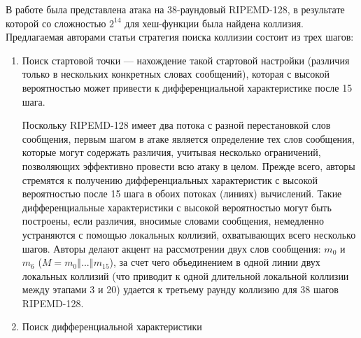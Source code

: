 \documentclass{./civarticle}
\begin{document}
В работе \cite{ripemdat1} была представлена атака на 38-раундовый RIPEMD-128, в результате которой со сложностью $2^{14}$ для хеш-функции была найдена коллизия. Предлагаемая авторами статьи стратегия поиска коллизии состоит из трех шагов:

\begin{enumerate}
    \item Поиск стартовой точки --- нахождение такой стартовой настройки
    (различия только в нескольких конкретных словах сообщений), которая с высокой вероятностью может привести к дифференциальной характеристике после 15 шага.

    Поскольку RIPEMD-128 имеет два потока с разной перестановкой слов сообщения, первым шагом в атаке является определение тех слов сообщения, которые могут содержать различия, учитывая несколько ограничений, позволяющих эффективно провести всю атаку в целом. 
    Прежде всего, авторы стремятся к получению дифференциальных характеристик с высокой вероятностью после 15 шага в обоих потоках (линиях) вычислений. Такие дифференциальные характеристики с высокой вероятностью могут быть построены, если различия, вносимые словами сообщения, немедленно устраняются с помощью локальных коллизий, охватывающих всего несколько шагов. Авторы делают акцент на рассмотрении двух слов сообщения: $m_0$ и $m_6$ ($M = m_0 \mathbin\Vert ... \mathbin\Vert m_{15}$), за счет чего объединением в одной линии двух локальных коллизий (что приводит к одной длительной локальной коллизии между этапами 3 и 20) удается к третьему раунду коллизию для 38 шагов RIPEMD-128.

    \begin{figure}[h!]
        \end{figure}
    
    \item Поиск дифференциальной характеристики


\end{enumerate}
\end{document}
